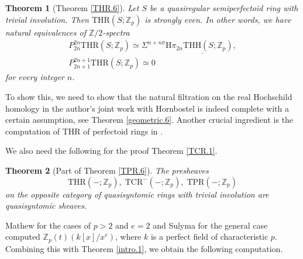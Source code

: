 \documentclass[10pt]{amsart}
\newtheorem{thm}{Theorem}[section]
\theoremstyle{definition}
\numberwithin{equation}{section}
\newcommand{\Z}{\mathbb{Z}}
\newcommand{\rH}{\mathrm{H}}
\newcommand{\ul}{\underline}
\newcommand{\THH}{\mathrm{THH}}
\newcommand{\TPR}{\mathrm{TPR}}
\newcommand{\THR}{\mathrm{THR}}
\newcommand{\TCR}{\mathrm{TCR}}
\begin{document}
\begin{thm}[Theorem \ref{THR.6}]
Let $S$ be a quasiregular semiperfectoid ring with trivial involution.
Then $\THR(S;\Z_p)$ is strongly even.
In other words,
we have natural equivalences of $\Z/2$-spectra
\begin{gather*}
P_{2n}^{2n}\THR(S;\Z_p)
\simeq
\Sigma^{n+n\sigma} \rH \ul{\pi_{2n}\THH(S;\Z_p)},
\\
P_{2n+1}^{2n+1} \THR(S;\Z_p)\simeq 0
\end{gather*}
for every integer $n$.
\end{thm}

To show this,
we need to show that the natural filtration on the real Hochschild homology in the author's joint work with Hornbostel \cite[Theorem 4.32]{HP} is indeed complete with a certain assumption,
see Theorem \ref{geometric.6}.
Another crucial ingredient is the computation of $\THR$ of perfectoid rings in \cite[Theorem 5.16]{HP}.

\medskip


We also need the following for the proof Theorem \ref{TCR.1}.


\begin{thm}[Part of Theorem \ref{TPR.6}]
The presheaves
\[
\THR(-;\Z_p),
\;
\TCR^-(-;\Z_p),
\;
\TPR(-;\Z_p)
\]
on the opposite category of quasisyntomic rings with trivial involution are quasisyntomic sheaves.
\end{thm}

Mathew \cite[Theorem 10.4]{M21} for the cases of $p>2$ and $e=2$ and Sulyma \cite[Theorem 1.1]{MR4632370} for the general case computed $\Z_p(t)(k[x]/x^e)$,
where $k$ is a perfect field of characteristic $p$.
Combining this with Theorem \ref{intro.1},
we obtain the following computation.
\end{document}
